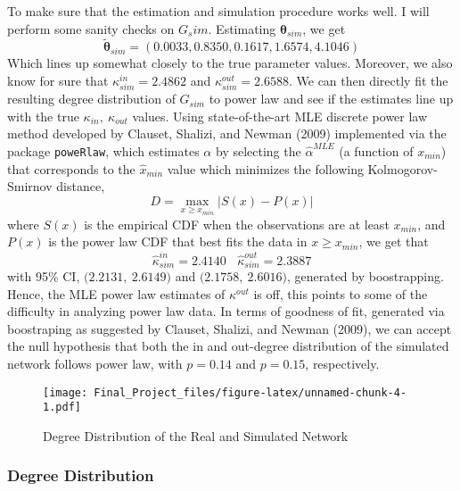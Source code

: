 \documentclass[]{elsarticle} %
\makeatletter
\def\maxwidth{\ifdim\Gin@nat@width>\linewidth\linewidth
\else\Gin@nat@width\fi}
\let\Oldincludegraphics\includegraphics
\renewcommand{\includegraphics}[1]{\Oldincludegraphics[width=\maxwidth]{#1}}
\makeatother
\begin{document}
To make sure that the estimation and simulation procedure works well. I
will perform some sanity checks on \(G_sim\). Estimating
\(\boldsymbol{\theta}_{sim}\), we get
\[\boldsymbol{\tilde{\theta}}_{sim} = (0.0033, 0.8350, 0.1617, 1.6574, 4.1046)\]
Which lines up somewhat closely to the true parameter values. Moreover,
we also know for sure that \(\kappa^{in}_{sim} = 2.4862\) and
\(\kappa^{out}_{sim} = 2.6588\). We can then directly fit the resulting
degree distribution of \(G_{sim}\) to power law and see if the estimates
line up with the true \(\kappa_{in}, \ \kappa_{out}\) values. Using
state-of-the-art MLE discrete power law method developed by Clauset,
Shalizi, and Newman (2009) implemented via the package
\texttt{poweRlaw}, which estimates \(\alpha\) by selecting the
\(\hat{\alpha}^{MLE}\) (a function of \(x_{min}\)) that corresponds to
the \(\hat{x}_{min}\) value which minimizes the following
Kolmogorov-Smirnov distance,
\[D = \max_{x \geq x_{min}} | S(x) - P(x) |\] where \(S(x)\) is the
empirical CDF when the observations are at least \(x_{min}\), and
\(P(x)\) is the power law CDF that best fits the data in
\(x \geq x_{min}\), we get that
\[\hat{\kappa}^{in}_{sim} = 2.4140 \ \ \ \ \hat{\kappa}^{out}_{sim} = 2.3887\]
with 95\% CI, \(\big(2.2131, \ 2.6149 \big)\) and
\(\big(2.1758, \  2.6016\big)\), generated by boostrapping. Hence, the
MLE power law estimates of \(\kappa^{out}\) is off, this points to some
of the difficulty in analyzing power law data. In terms of goodness of
fit, generated via boostraping as suggested by Clauset, Shalizi, and
Newman (2009), we can accept the null hypothesis that both the in and
out-degree distribution of the simulated network follows power law, with
\(p = 0.14\) and \(p = 0.15\), respectively.

\begin{figure}[htbp]
\centering
\texttt{[image: Final\_Project\_files/figure-latex/unnamed-chunk-4-1.pdf]}
\caption{Degree Distribution of the Real and Simulated Network}
\end{figure}

\subsubsection{Degree Distribution}\label{degree-distribution}
\end{document}
